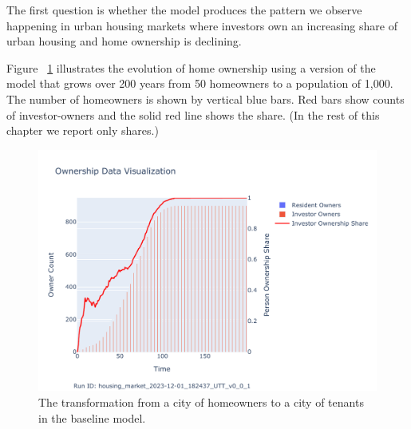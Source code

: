 

The first question is whether the model produces the pattern we observe happening in urban housing markets where investors own an increasing share of urban housing and home ownership is declining. %

Figure ~\ref{fig:Baseline_ownership_trajectory} illustrates the evolution of home ownership using a version of the model that grows over 200 years from 50 homeowners to a population of 1,000. The number of homeowners is shown by vertical blue bars.  Red bars show counts of investor-owners and the solid red line shows the share. (In the rest of this chapter we report only shares.) %




\begin{figure}[h!tb]
    \centering
    \hspace{4cm} %
    \includegraphics[scale=0.8, trim={0 1cm 0 1.8cm}, clip]{fig/Analysis/Ownership_Data_1.pdf}
    \caption{The transformation from a city of homeowners to a city of tenants in the baseline model.}
    \label{fig:Baseline_ownership_trajectory}
\end{figure}


